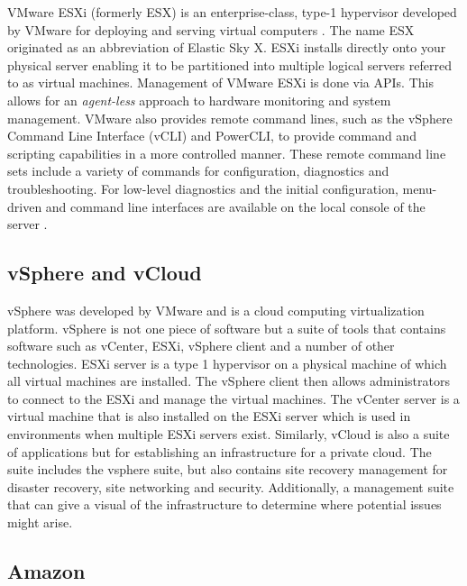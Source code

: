 {     VMware ESXi (formerly ESX) is an enterprise-class, type-1
     hypervisor developed by VMware for deploying and serving virtual
     computers \cite{wiki-vmwareESXi}. The name ESX originated as an
     abbreviation of Elastic Sky X. ESXi installs directly onto your
     physical server enabling it to be partitioned into multiple
     logical servers referred to as virtual machines.  Management of
     VMware ESXi is done via APIs. This allows for an \textit{agent-less}
     approach to hardware monitoring and system management. VMware
     also provides remote command lines, such as the vSphere Command
     Line Interface (vCLI) and PowerCLI, to provide command and
     scripting capabilities in a more controlled manner. These remote
     command line sets include a variety of commands for
     configuration, diagnostics and troubleshooting. For low-level
     diagnostics and the initial configuration, menu-driven and
     command line interfaces are available on the local console of the
     server \cite{vmware-esxi}.
     
     
\subsection{vSphere and vCloud \cv}

     vSphere was developed by VMware and is a cloud computing 
     virtualization platform. \cite{www-vmware}  vSphere is not
     one piece of software but a suite of tools that contains software 
     such as vCenter, ESXi, vSphere client and a number of other 
     technologies.  ESXi server is a type 1 hypervisor on a physical 
     machine of which all virtual machines are installed.  
     The vSphere client then allows administrators to connect to 
     the ESXi and manage the virtual machines.  The vCenter server 
     is a virtual machine that is also installed on the 
     ESXi server which is used in environments when multiple ESXi 
     servers exist.  Similarly, vCloud is also a suite of 
     applications but for establishing an infrastructure for a 
     private cloud. \cite{www-mustbegeek}  The suite includes the 
     vsphere suite, but also contains site recovery management for 
     disaster recovery,  site networking and security.  Additionally, 
     a management suite that can give a visual of the infrastructure 
     to determine where potential issues might arise.
     
\subsection{Amazon \cv}

}
